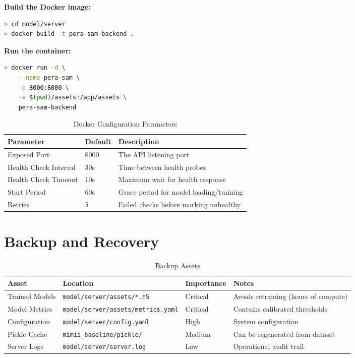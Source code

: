 \documentclass[10pt, a4paper, oneside]{report}
\begin{document}
\textbf{Build the Docker image:}
\begin{lstlisting}[language=bash]
> cd model/server
> docker build -t pera-sam-backend .
\end{lstlisting}

\textbf{Run the container:}
\begin{lstlisting}[language=bash]
> docker run -d \
    --name pera-sam \
    -p 8000:8000 \
    -v $(pwd)/assets:/app/assets \
    pera-sam-backend
\end{lstlisting}

\begin{table}[H]
\centering
\caption{Docker Configuration Parameters}
\label{tab:docker-config}
\begin{tabularx}{\textwidth}{l l X}
  \toprule
  \textbf{Parameter} & \textbf{Default} & \textbf{Description} \\
  \midrule
  Exposed Port           & 8000 & The API listening port \\
  Health Check Interval  & 30s  & Time between health probes \\
  Health Check Timeout   & 10s  & Maximum wait for health response \\
  Start Period           & 60s  & Grace period for model loading/training \\
  Retries                & 5    & Failed checks before marking unhealthy \\
  \bottomrule
\end{tabularx}
\end{table}

\section{Backup and Recovery}
\label{sec:backup}

\begin{table}[H]
\centering
\caption{Backup Assets}
\label{tab:backup}
\begin{tabularx}{\textwidth}{l l l X}
  \toprule
  \textbf{Asset} & \textbf{Location} & \textbf{Importance} & \textbf{Notes} \\
  \midrule
  Trained Models  & \texttt{model/server/assets/*.h5}      & Critical & Avoids retraining (hours of compute) \\
  Model Metrics   & \texttt{model/server/assets/metrics.yaml} & Critical & Contains calibrated thresholds \\
  Configuration   & \texttt{model/server/config.yaml}       & High     & System configuration \\
  Pickle Cache    & \texttt{mimii\_baseline/pickle/}        & Medium   & Can be regenerated from dataset \\
  Server Logs     & \texttt{model/server/server.log}        & Low      & Operational audit trail \\
  \bottomrule
\end{tabularx}
\end{table}
\end{document}
